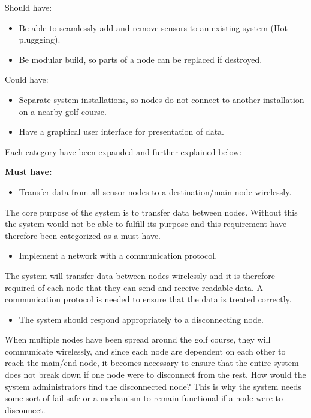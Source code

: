 Should have:
\begin{itemize}
\item Be able to seamlessly add and remove sensors to an existing system (Hot-pluggging).
\item Be modular build, so parts of a node can be replaced if destroyed.
\end{itemize}

Could have:
\begin{itemize}
\item Separate system installations, so nodes do not connect to another installation on a nearby golf course.
\item Have a graphical user interface for presentation of data.
\end{itemize}

\pagebreak


Each category have been expanded and further explained below:

\textbf{Must have:}
\begin{itemize}
\item Transfer data from all sensor nodes to a destination/main node wirelessly.
\end{itemize}
The core purpose of the system is to transfer data between nodes. Without this the system would not be able to fulfill its purpose and this requirement have therefore been categorized as a must have.


\begin{itemize}
\item Implement a network with a communication protocol.
\end{itemize}
The system will transfer data between nodes wirelessly and it is therefore required of each node that they can send and receive readable data. A communication protocol is needed to ensure that the data is treated correctly.


\begin{itemize}
\item The system should respond appropriately to a disconnecting node.
\end{itemize}
When multiple nodes have been spread around the golf course, they will communicate wirelessly, and since each node are dependent on each other to reach the main/end node, it becomes necessary to ensure that the entire system does not break down if one node were to disconnect from the rest. How would the system administrators find the disconnected node? This is why the system needs some sort of fail-safe or a mechanism to remain functional if a node were to disconnect.


